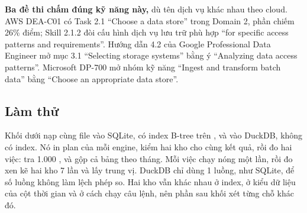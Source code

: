 \begin{ghichu}
\textbf{Ba đề thi chấm đúng kỹ năng này,} dù tên dịch vụ khác nhau theo cloud. AWS DEA-C01 có Task 2.1 ``Choose a data store'' trong Domain 2, phần chiếm 26\% điểm; Skill 2.1.2 đòi cấu hình dịch vụ lưu trữ phù hợp ``for specific access patterns and requirements''. Hướng dẫn 4.2 của Google Professional Data Engineer mở mục 3.1 ``Selecting storage systems'' bằng ý ``Analyzing data access patterns''. Microsoft DP-700 mở nhóm kỹ năng ``Ingest and transform batch data'' bằng ``Choose an appropriate data store''.
\end{ghichu}

\subsection{Làm thử}

Khối dưới nạp cùng file  vào SQLite, có index B-tree trên , và vào DuckDB, không có index. Nó in plan của mỗi engine, kiểm hai kho cho cùng kết quả, rồi đo hai việc: tra 1.000 , và gộp cả bảng theo tháng. Mỗi việc chạy nóng một lần, rồi đo xen kẽ hai kho 7 lần và lấy trung vị. DuckDB chỉ dùng 1 luồng, như SQLite, để số luồng không làm lệch phép so. Hai kho vẫn khác nhau ở index, ở kiểu dữ liệu của cột thời gian và ở cách chạy câu lệnh, nên phần sau khối xét từng chỗ khác đó.


